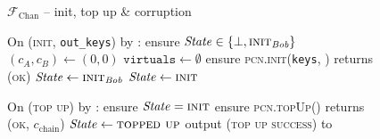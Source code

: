 
\begin{figure}[H]
  \begin{systembox}{$\mathcal{F}_{\mathrm{Chan}}$ -- init, top up \& corruption}
    \begin{algorithmic}[1]
      \State On (\textsc{init}, \texttt{out\_keys}) by \alice:
      \label{code:functionality:chan:skeleton:init:init:start}
      \Indent
        \State ensure $\mathit{State} \in \{\bot, \textsc{init}_{\mathit{Bob}}\}$
        \State $(c_A, c_B) \gets (0, 0)$
        \State $\texttt{virtuals} \gets \emptyset$
        \State ensure \textsc{pcn.init}(\texttt{keys}, \alice) returns
        (\textsc{ok})
          \State $\mathit{State} \gets \textsc{init}_{\mathit{Bob}}$
        \Else \: 
          \State $\mathit{State} \gets \textsc{init}$
        \EndIf
        \label{code:functionality:chan:skeleton:init:init:end}
      \EndIndent
      \Statex

      \State On (\textsc{top up}) by \alice:
      \label{code:functionality:chan:skeleton:init:top_up:start}
      \Indent
        \State ensure $\mathit{State} = \textsc{init}$
        \State ensure \textsc{pcn.topUp}(\alice) returns (\textsc{ok},
        $c_{\mathrm{chain}}$)
        \State $\mathit{State} \gets \textsc{topped up}$
        \State output (\textsc{top up success}) to \alice
        \label{code:functionality:chan:skeleton:init:top_up:end}
      \EndIndent
      \Statex


\end{algorithmic}
\end{systembox}
\end{figure}
